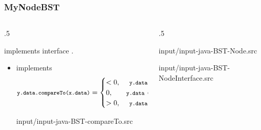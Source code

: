 \documentclass[10pt]{beamer}
\begin{document}
\begin{frame}[t]\frametitle{MyNodeBST}
	\vspace{-0.3cm}
	\begin{columns}[T] %
	\begin{column}{.5\linewidth} %
		{\tiny 
		
		} %

		{\scriptsize 
			  implements interface .

		\begin{itemize}
			
			\item
			 implements 			
			{\tiny 
			\[
			\hCode{y.data.compareTo(x.data)}
			= \begin{cases}
			      < 0, &\hCode{ y.data < x.data}, \\
			      0, &\hCode{y.data = x.data}, \\
			      > 0, &\hCode{ y.data > x.data}.
			\end{cases}
			\]
			} %
			{\tiny 
				
					{input/input-java-BST-compareTo.src}
			} %
			
		\end{itemize}
		
		} %
	\end{column} %
	\begin{column}{.5\linewidth} %
		{\tiny 
			
				{input/input-java-BST-Node.src}
		} %
		{\tiny 
			
				{input/input-java-BST-NodeInterface.src}
		} %
	\end{column} %
	\end{columns} %

\end{frame}
\end{document}
